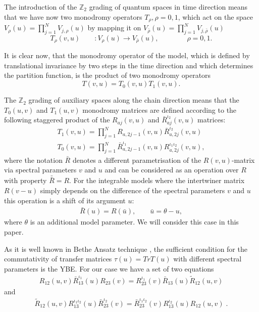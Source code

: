 \documentclass[a4paper,11pt]{article}
\def\ZZ{{\mathbb Z}}
\begin{document}
The introduction of the $\ZZ_2$ grading of quantum spaces 
in time direction means
that we have now two monodromy operators $T_{\rho}, \rho=0,1$,
which act on the space $V_{\rho}(u)=\prod_{j=1}^N V_{j,\rho}(u)$
by mapping it on $V_{\bar{\rho}}(u)=\prod_{j=1}^N V_{j,\bar{\rho}}(u)$
\begin{equation}
\label{T}
T_\rho(v,u) \qquad : V_\rho(u) \rightarrow V_{\bar{\rho}}(u), \qquad \qquad 
\rho=0,1.
\end{equation}

It is clear now, that the monodromy operator of the model, which is defined
by translational invariance by two steps in the time direction and
which determines the partition function, is the product of two
monodromy operators 
\begin{equation}
\label{TT}
T(v,u) = T_0(v,u) T_1(v,u).
\end{equation}

The $\ZZ_2$ grading of auxiliary spaces along the chain direction means
that the $T_0(u,v)$ and $T_1(u,v)$ monodromy matrices are defined
according to the following staggered product
of the $R_{aj}(v,u)$ and $\bar{R}_{aj}^{\iota_2}(v,u)$ matrices:
\begin{eqnarray}
\label{T1}
T_1(v,u)=\prod_{j=1}^N R_{a,2j-1}(v,u)
\bar{R}_{a,2j}^{\iota_2}(v,u)\nonumber\\
T_0(v,u)=\prod_{j=1}^N \bar{R}_{a,2j-1}^{\iota_1}(v,u)
R_{a,2j}^{\iota_1 \iota_2}(v,u),
\end{eqnarray}
where the notation $\bar{R}$ denotes a 
different parametrisation of the $R(v,u)$-matrix via spectral
parameters
$v$ and $u$ and can be considered as an operation
over $R$ with property $\bar{\bar{R}}= R$.
For the integrable models where the intertwiner matrix $R(v-u)$
simply depends
on the difference of the spectral parameters $v$ and $u$ 
this operation is a shift of its argument $u$:
\begin{eqnarray}
 \label{RR}
 \bar{R}(u)=R(\bar u), \qquad \bar{u}=\theta-u,
 \end{eqnarray}
where $\theta$ is an additional model parameter. We will consider
this case in this paper.

As it is well known in Bethe Ansatz technique \cite{B, FT}, the sufficient
condition for the commutativity of transfer matrices $\tau(u)=
Tr T(u)$ with different spectral parameters is the YBE. For our
case we have a set of two equations \cite{APSS}
\begin{eqnarray}
  \label{eq:YBE1}
  R_{12}(u,v) \bar{R}_{13}^{\iota_1}(u) R_{23}(v)=
  R_{23}^{\iota_1}(v) \bar{R}_{13}(u) \tilde{R}_{12}(u,v)
\end{eqnarray}
and
\begin{eqnarray}
  \label{eq:YBE2}
  \tilde{R}_{12}(u,v) R_{13}^{\iota_1 \iota_2}(u) 
  \bar{R}_{23}^{\iota_2}(v)=
  \bar{R}_{23}^{\iota_1 \iota_2}(v) R_{13}^{\iota_2}(u) R_{12}(u,v) \;.
\end{eqnarray}
\end{document}
